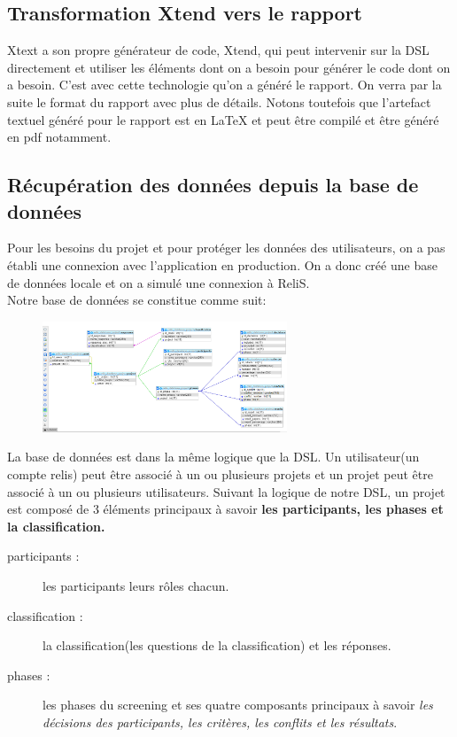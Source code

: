 \vspace*{3mm}

\subsection{Transformation Xtend vers le rapport}
Xtext a son propre générateur de code, Xtend, qui peut intervenir sur la DSL directement et utiliser les éléments dont on a besoin pour générer le code dont on a besoin. C'est avec cette technologie qu'on a généré le rapport. On verra par la suite le format du rapport avec plus de détails. Notons toutefois que l'artefact textuel généré pour le rapport est en \LaTeX{} et peut être compilé et être généré en pdf notamment.
\newpage
\subsection{Récupération des données depuis la base de données}
Pour les besoins du projet et pour protéger les données des utilisateurs, on a pas établi une connexion avec l'application en production. On a donc créé une base de données locale et on a simulé une connexion à ReliS. \\
Notre base de données se constitue comme suit:
\begin{figure}[H]
        \centering
        \includegraphics[width=0.65\textwidth]{resources/images/DB.PNG}
\end{figure}

\vspace*{2mm}

La base de données est dans la même logique que la DSL. Un utilisateur(un compte relis) peut être associé à un ou plusieurs projets et un projet peut être associé à un ou plusieurs utilisateurs.
Suivant la logique de notre DSL, un projet est composé de 3 éléments principaux à savoir \textbf{les participants, les phases et la classification.}

\begin{description}
    \item[participants :] les participants leurs rôles chacun.
    \item[classification :] la classification(les questions de la classification) et les réponses.
    \item[phases :] les phases du screening et ses quatre composants principaux à savoir \textit{les décisions des participants, les critères, les conflits et les résultats}. 
\end{description}

